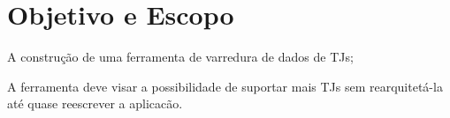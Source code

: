 \section{Objetivo e Escopo}

\begin{todolist}
    \item A construção de uma ferramenta de varredura de dados de TJs;
    \item A ferramenta deve visar a possibilidade de suportar mais TJs sem
          rearquitetá-la até quase reescrever a aplicacão.
\end{todolist}
